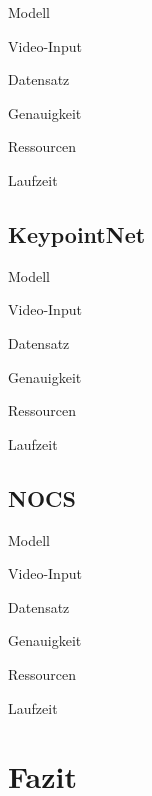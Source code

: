 \documentclass[a4paper, 11pt]{article}
\begin{document}
\begin{multicols*}{2}
    \begin{description*}
        \item[Modell]
        \item[Video-Input]
        \item[Datensatz]
        \item[Genauigkeit]
        \begin{itemize*}
            \item
        \end{itemize*}
        \item[Ressourcen]
        \item[Laufzeit]
    \end{description*}

    \subsection{KeypointNet}

    \begin{description*}
        \item[Modell]
        \item[Video-Input]
        \item[Datensatz]
        \item[Genauigkeit]
        \begin{itemize*}
            \item
        \end{itemize*}
        \item[Ressourcen]
        \item[Laufzeit]
    \end{description*}

    \subsection{NOCS}

    \begin{description*}
        \item[Modell]
        \item[Video-Input]
        \item[Datensatz]
        \item[Genauigkeit]
        \begin{itemize*}
            \item
        \end{itemize*}
        \item[Ressourcen]
        \item[Laufzeit]
    \end{description*}


    \section{Fazit}

\end{multicols*}
\end{document}
